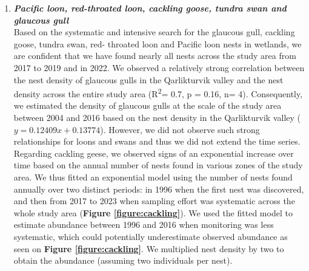 \documentclass[a4paper,twoside,12pt]{article}
\begin{document}
        \begin{enumerate}[label=\alph*.]       
     \item[] \textit{\textbf{Pacific loon, red-throated loon, cackling goose, tundra swan and glaucous gull}}   \\
Based on the systematic and intensive search for the glaucous gull, cackling goose, tundra swan, red- throated loon and Pacific loon nests in wetlands, we are confident that we have found nearly all nests across the study area from 2017 to 2019 and in 2022. We observed a relatively strong correlation between the nest density of glaucous gulls in the Qarlikturvik valley and the nest density across the entire study area (R\textsuperscript{2}= 0.7, p = 0.16, n= 4). Consequently, we estimated the density of glaucous gulls at the scale of the study area between 2004 and 2016 based on the nest density in the Qarlikturvik valley ($y = 0.12409x + 0.13774$). However, we did not observe such strong relationships for loons and swans and thus we did not extend the time series. Regarding cackling geese, we observed signs of an exponential increase over time based on the annual number of nests found in various zones of the study area. We thus fitted an exponential model using the number of nests found annually over two distinct periods: in 1996 when the first nest was discovered, and then from 2017 to 2023 when sampling effort was systematic across the whole study area (\textbf{Figure \ref{figure:cackling}}). We used the fitted model to estimate abundance between 1996 and 2016 when monitoring was less systematic, which could potentially underestimate observed abundance as seen on \textbf{Figure \ref{figure:cackling}}. We multiplied nest density by two to obtain the abundance (assuming two individuals per nest). 


\end{enumerate}
\end{document}
